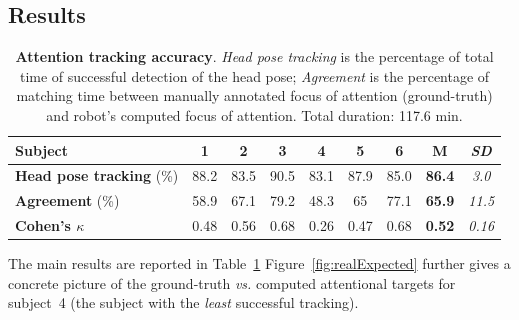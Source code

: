 \documentclass{sig-alternate}
\newcommand{\vs}{\textit{vs.}\xspace}
\begin{document}
\subsection{Results}

\begin{table}[ht!]
    \centering
    \caption{\textbf{Attention tracking accuracy}. \emph{Head pose
    tracking} is the percentage of total time of successful detection of the
    head pose; \emph{Agreement} is the percentage of matching time
    between manually annotated focus of attention (ground-truth) and robot's
    computed focus of attention. Total duration: 117.6 min.}

    \begin{tabular}{p{5.5cm}cccccccc}
        \toprule
        {\bf Subject} & 1 & 2 & 3 & 4 & 5 & 6 & {\bf M} & {\it SD} \\
        \midrule
        {\bf Head pose tracking} (\%) & 88.2 & 83.5 & 90.5 & 83.1 & 87.9 & 85.0 & {\bf 86.4} & {\it 3.0} \\ 
        \midrule
        {\bf Agreement} (\%) & 58.9 & 67.1 & 79.2 & 48.3 & 65 & 77.1 & {\bf 65.9} & {\it 11.5}\\
        {\bf Cohen's $\kappa$} & 0.48 & 0.56 & 0.68 & 0.26 & 0.47 & 0.68 & {\bf 0.52} & {\it 0.16}\\
        \bottomrule
    \end{tabular}
    \label{tab:results}
\end{table}

The main results are reported in Table~\ref{tab:results}
Figure~\ref{fig:realExpected} further gives a concrete picture of the
ground-truth \vs computed attentional targets for subject~4 (the subject with
the \emph{least} successful tracking).

%
\end{document}
